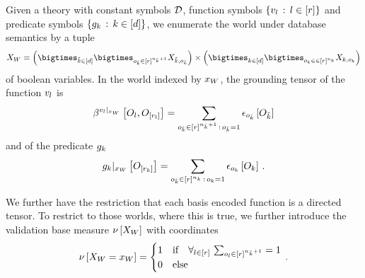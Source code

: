 \begin{definition}
    \label{def:worldEnumeratingVariables}
    Given a \firstOrderLogic{} theory with constant symbols $\mathcal{D}$, function symbols $\{v_{l}\,:\,l\in[r]\}$ and predicate symbols $\{g_{k}\,:\,k\in[d]\}$, we enumerate the world under database semantics by a tuple
    \begin{align*}
        \worldvariables
        = \left(\bigtimes_{\seccatenumeratorin}\bigtimes_{\indindexof{\seccatenumerator}\in[\inddim]^{\indorderof{\seccatenumerator}+1}} \catvariableof{\seccatenumerator,\indindexof{\seccatenumerator}} \right)
        \times \left(\bigtimes_{\catenumeratorin}\bigtimes_{\indindexof{\catenumerator}\in\in[\inddim]^{\indorderof{\catenumerator}}} \catvariableof{\catenumerator,\indindexof{\catenumerator}} \right)
    \end{align*}
    of boolean variables.
    In the world indexed by $x_{W}$, the grounding tensor of the function $v_{l}$ is
    \begin{align*}
        \bencodingofat{\groundingof{\folfunctionof{\secatomenumerator}}}{\indvariableof{\secatomenumerator},\indvariableof{[\inddimof{\secatomenumerator}]}}
        = \sum_{\indindexof{\seccatenumerator}\in[\inddim]^{\indorderof{\seccatenumerator}+1}\wcols\indindexof{\seccatenumerator}=1} \onehotmapofat{\indindexof{\seccatenumerator}}{\indvariableof{\seccatenumerator}}
    \end{align*}
    and of the predicate $g_{k}$
    \begin{align*}
        {g_{k}}|_{x_{W}} \left[O_{[r_{k}]}\right]
        = \sum_{o_{\tilde{k}}\in[r]^{n_{k}}\,:\,o_{k}=1}
        \epsilon_{o_{k}}\left[O_{k}\right] \, .
    \end{align*}
\end{definition}

We further have the restriction that each basis encoded function is a directed tensor.
To restrict to those worlds, where this is true, we further introduce the validation base measure $\nu\left[X_{W}\right]$ with coordinates
\begin{align*}
    \nu\left[X_{W}=x_{W}\right] =
    \begin{cases}
        1 & \text{if}\quad \forall_{l\in[r]} \,\, {\sum_{o_{l}\in[r]^{n_{\tilde{k}}+1}}=1} \\
        0 & \text{else}
    \end{cases} \, .
\end{align*}


